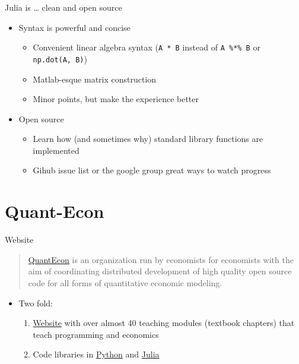 \documentclass[compress,10pt]{beamer}
\begin{document}
\begin{frame}{Julia is \ldots{} clean and open source}

\begin{itemize}
\itemsep1pt\parskip0pt
\item
  Syntax is powerful and concise

  \begin{itemize}
  \itemsep1pt\parskip0pt
  \item
    Convenient linear algebra syntax (\texttt{A\ *\ B} instead of
    \texttt{A\ \%*\%\ B} or \texttt{np.dot(A,\ B)})
  \item
    Matlab-esque matrix construction
  \item
    Minor points, but make the experience better
  \end{itemize}
\item
  Open source

  \begin{itemize}
  \itemsep1pt\parskip0pt
  \item
    Learn how (and sometimes why) standard library functions are
    implemented
  \item
    Gihub issue list or the google group great ways to watch progress
  \end{itemize}
\end{itemize}

\end{frame}

\section{Quant-Econ}\label{quant-econ}

\begin{frame}{Website}

\begin{quote}
\href{http://quantecon.org}{QuantEcon} is an organization run by
economists for economists with the aim of coordinating distributed
development of high quality open source code for all forms of
quantitative economic modeling.
\end{quote}

\begin{itemize}
\itemsep1pt\parskip0pt
\item
  Two fold:

  \begin{enumerate}
  \def\labelenumi{\arabic{enumi}.}
  \itemsep1pt\parskip0pt
  \item
    \href{http://quant-econ.net}{Website} with over almost 40 teaching
    modules (textbook chapters) that teach programming and economics
  \item
    Code libraries in
    \href{https://github.com/QuantEcon/QuantEcon.py}{Python} and
    \href{https://github.com/QuantEcon/QuantEcon.jl}{Julia}
  \end{enumerate}
\end{itemize}

\end{frame}
\end{document}
